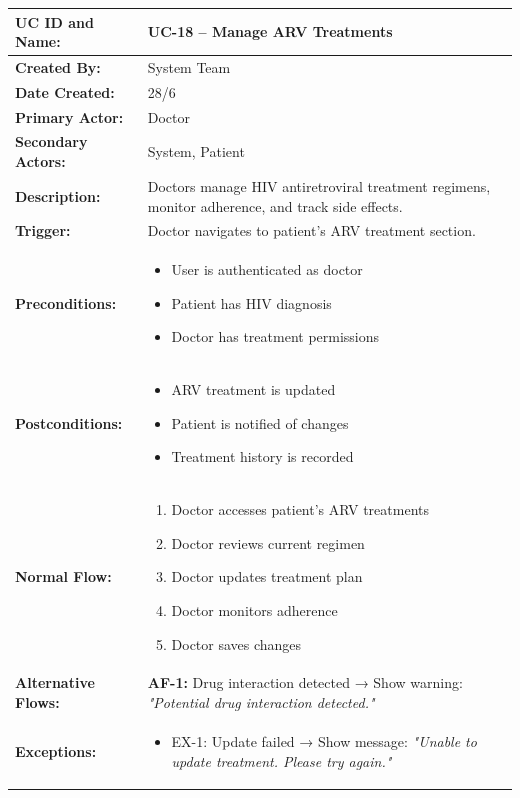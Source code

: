 \documentclass[12pt,a4paper]{article}
\begin{document}
\renewcommand{\arraystretch}{1.5}
\begin{longtable}{|p{4.5cm}|p{10.5cm}|}
\hline
\textbf{UC ID and Name:} & UC-18 – Manage ARV Treatments \\
\hline
\textbf{Created By:} & System Team \\
\hline
\textbf{Date Created:} & 28/6 \\
\hline
\textbf{Primary Actor:} & Doctor \\
\hline
\textbf{Secondary Actors:} & System, Patient \\
\hline
\textbf{Description:} & Doctors manage HIV antiretroviral treatment regimens, monitor adherence, and track side effects. \\
\hline
\textbf{Trigger:} & Doctor navigates to patient's ARV treatment section. \\
\hline
\textbf{Preconditions:} &
\begin{itemize}
  \item User is authenticated as doctor
  \item Patient has HIV diagnosis
  \item Doctor has treatment permissions
\end{itemize} \\
\hline
\textbf{Postconditions:} &
\begin{itemize}
  \item ARV treatment is updated
  \item Patient is notified of changes
  \item Treatment history is recorded
\end{itemize} \\
\hline
\textbf{Normal Flow:} &
\begin{enumerate}
  \item Doctor accesses patient's ARV treatments
  \item Doctor reviews current regimen
  \item Doctor updates treatment plan
  \item Doctor monitors adherence
  \item Doctor saves changes
\end{enumerate} \\
\hline
\textbf{Alternative Flows:} &
\textbf{AF-1:} Drug interaction detected → Show warning: \textit{"Potential drug interaction detected."} \\
\hline
\textbf{Exceptions:} &
\begin{itemize}
  \item EX-1: Update failed → Show message: \textit{"Unable to update treatment. Please try again."}

\end{itemize}
\end{longtable}
\end{document}
